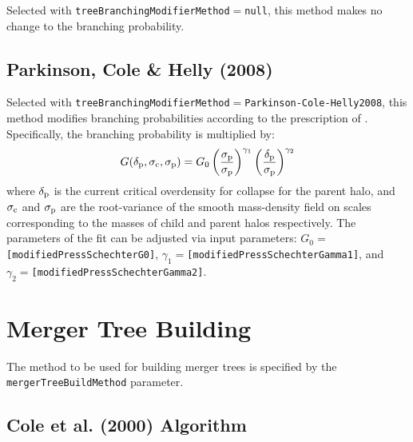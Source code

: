 Selected with {\tt treeBranchingModifierMethod}$=${\tt null}, this method makes no change to the branching probability.

\subsection{Parkinson, Cole \& Helly (2008)}

Selected with {\tt treeBranchingModifierMethod}$=${\tt Parkinson-Cole-Helly2008}, this method modifies branching probabilities according to the prescription of \cite{parkinson_generating_2008}. Specifically, the branching probability is multiplied by:
\begin{equation}
 G(\delta_{\rm p},\sigma_{\rm c},\sigma_{\rm p}) = G_0 \left({\sigma_{\rm p}\over\sigma_{\rm p}}\right)^{\gamma_1} \left({\delta_{\rm p}\over\sigma_{\rm p}}\right)^{\gamma_2}
\end{equation}
where $\delta_{\rm p}$ is the current critical overdensity for collapse for the parent halo, and $\sigma_{\rm c}$ and $\sigma_{\rm p}$ are the root-variance of the smooth mass-density field on scales corresponding to the masses of child and parent halos respectively. The parameters of the fit can be adjusted via input parameters: $G_0=${\tt [modifiedPressSchechterG0]}, $\gamma_1=${\tt [modifiedPressSchechterGamma1]}, and $\gamma_2=${\tt [modifiedPressSchechterGamma2]}.

\section{Merger Tree Building}

The method to be used for building merger trees is specified by the {\tt mergerTreeBuildMethod} parameter.

\subsection{Cole et al. (2000) Algorithm}

